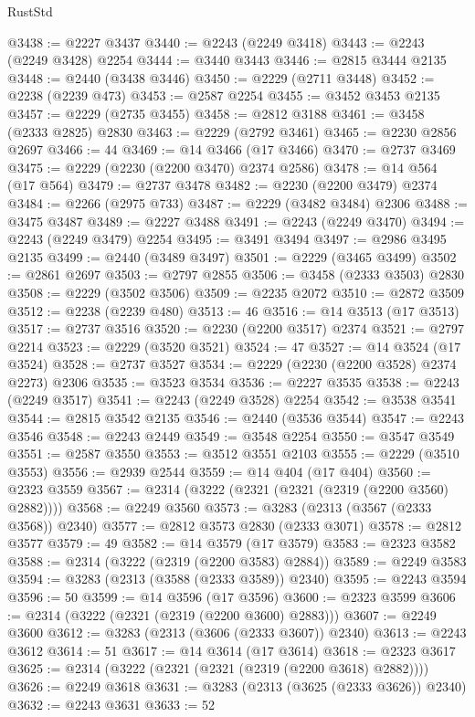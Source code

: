 \begin{lexlean}{RustStd}
\begin{coremodule}
{\begin{coremodule}
{{{{{{{{{{{{{{{{{{{{{{{{{{{{{{{{{{@3438 := @2227 @3437
@3440 := @2243 (@2249 @3418)
@3443 := @2243 (@2249 @3428) @2254
@3444 := @3440 @3443
@3446 := @2815 @3444 @2135
@3448 := @2440 (@3438 @3446)
@3450 := @2229 (@2711 @3448)
@3452 := @2238 (@2239 @473)
@3453 := @2587 @2254
@3455 := @3452 @3453 @2135
@3457 := @2229 (@2735 @3455)
@3458 := @2812 @3188
@3461 := @3458 (@2333 @2825) @2830
@3463 := @2229 (@2792 @3461)
@3465 := @2230 @2856 @2697
@3466 := 44
@3469 := @14 @3466 (@17 @3466)
@3470 := @2737 @3469
@3475 := @2229 (@2230 (@2200 @3470) @2374 @2586)
@3478 := @14 @564 (@17 @564)
@3479 := @2737 @3478
@3482 := @2230 (@2200 @3479) @2374
@3484 := @2266 (@2975 @733)
@3487 := @2229 (@3482 @3484) @2306
@3488 := @3475 @3487
@3489 := @2227 @3488
@3491 := @2243 (@2249 @3470)
@3494 := @2243 (@2249 @3479) @2254
@3495 := @3491 @3494
@3497 := @2986 @3495 @2135
@3499 := @2440 (@3489 @3497)
@3501 := @2229 (@3465 @3499)
@3502 := @2861 @2697
@3503 := @2797 @2855
@3506 := @3458 (@2333 @3503) @2830
@3508 := @2229 (@3502 @3506)
@3509 := @2235 @2072
@3510 := @2872 @3509
@3512 := @2238 (@2239 @480)
@3513 := 46
@3516 := @14 @3513 (@17 @3513)
@3517 := @2737 @3516
@3520 := @2230 (@2200 @3517) @2374
@3521 := @2797 @2214
@3523 := @2229 (@3520 @3521)
@3524 := 47
@3527 := @14 @3524 (@17 @3524)
@3528 := @2737 @3527
@3534 := @2229 (@2230 (@2200 @3528) @2374 @2273) @2306
@3535 := @3523 @3534
@3536 := @2227 @3535
@3538 := @2243 (@2249 @3517)
@3541 := @2243 (@2249 @3528) @2254
@3542 := @3538 @3541
@3544 := @2815 @3542 @2135
@3546 := @2440 (@3536 @3544)
@3547 := @2243 @3546
@3548 := @2243 @2449
@3549 := @3548 @2254
@3550 := @3547 @3549
@3551 := @2587 @3550
@3553 := @3512 @3551 @2103
@3555 := @2229 (@3510 @3553)
@3556 := @2939 @2544
@3559 := @14 @404 (@17 @404)
@3560 := @2323 @3559
@3567 := @2314 (@3222 (@2321 (@2321 (@2319 (@2200 @3560) @2882))))
@3568 := @2249 @3560
@3573 := @3283 (@2313 (@3567 (@2333 @3568)) @2340)
@3577 := @2812 @3573 @2830 (@2333 @3071)
@3578 := @2812 @3577
@3579 := 49
@3582 := @14 @3579 (@17 @3579)
@3583 := @2323 @3582
@3588 := @2314 (@3222 (@2319 (@2200 @3583) @2884))
@3589 := @2249 @3583
@3594 := @3283 (@2313 (@3588 (@2333 @3589)) @2340)
@3595 := @2243 @3594
@3596 := 50
@3599 := @14 @3596 (@17 @3596)
@3600 := @2323 @3599
@3606 := @2314 (@3222 (@2321 (@2319 (@2200 @3600) @2883)))
@3607 := @2249 @3600
@3612 := @3283 (@2313 (@3606 (@2333 @3607)) @2340)
@3613 := @2243 @3612
@3614 := 51
@3617 := @14 @3614 (@17 @3614)
@3618 := @2323 @3617
@3625 := @2314 (@3222 (@2321 (@2321 (@2319 (@2200 @3618) @2882))))
@3626 := @2249 @3618
@3631 := @3283 (@2313 (@3625 (@2333 @3626)) @2340)
@3632 := @2243 @3631
@3633 := 52
}}}}}}}}}}}}}}}}}}}}}}}}}}}}}}}}}}
\end{coremodule}}
\end{coremodule}
\end{lexlean}
